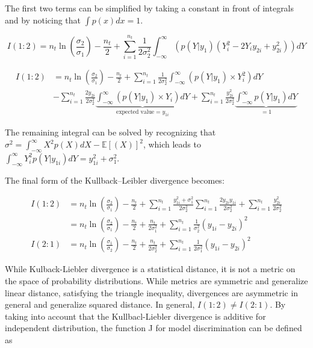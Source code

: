 \documentclass[../Article_Design_of_Experiment.tex]{subfiles}
\begin{document}
	The first two terms can be simplified by taking a constant in front of integrals and by noticing that $\int p(x) dx = 1$. 
	
	{\footnotesize
	\begin{equation}
		I(1:2) = n_t \ln \left(\frac{\sigma_2}{\sigma_1} \right) - \frac{n_t}{2} + \sum_{i=1}^{n_t} \frac{1}{2\sigma_2^2} \int_{-\infty}^{\infty} \left( p(Y|y_1) \left( Y_i^2 - 2Y_iy_{2i} + y_{2i}^2 \right)  \right) dY
	\end{equation}} 
	
	{\footnotesize
	\begin{align}
		I(1:2) &= n_t \ln \left(\frac{\sigma_2}{\sigma_1} \right) - \frac{n_t}{2} + \sum_{i=1}^{n_t} \frac{1}{2\sigma_2^2} \int_{-\infty}^{\infty} \left( p(Y|y_1) \times Y_i^2  \right) dY \nonumber \\ 
		&-\sum_{i=1}^{n_t} \frac{2y_{2i}}{2\sigma_2^2} \underbrace{\int_{-\infty}^{\infty} \left( p(Y|y_1) \times Y_i  \right) dY}_{\text{expected value} = y_{1i} } +\sum_{i=1}^{n_t} \frac{y_{2i}^2}{2\sigma_2^2} \underbrace{\int_{-\infty}^{\infty} p(Y|y_1) dY}_{=1}
	\end{align} }
	
	The remaining integral can be solved by recognizing that $\sigma^2 = \int_{-\infty}^{\infty} X^2 p(X) dX - \mathbb{E}[(X)]^2$, which leads to $\int_{-\infty}^{\infty} Y_i^2 p(Y|y_{1i}) dY = y_{1i}^2 + \sigma_1^2$. 
	
	The final form of the Kullback–Leibler divergence becomes:
	
	{\footnotesize
	\begin{align}
		I(1:2) &= n_t \ln \left(\frac{\sigma_2}{\sigma_1} \right) - \frac{n_t}{2} + \sum_{i=1}^{n_t} \frac{y_{1i}^2 + \sigma_1^2}{2\sigma_2^2} \sum_{i=1}^{n_t} \frac{2y_{2i}y_{1i}}{2\sigma_2^2} +\sum_{i=1}^{n_t}  \frac{y_{2i}^2}{2\sigma_2^2} \nonumber \\
		&= n_t \ln \left(\frac{\sigma_2}{\sigma_1} \right) - \frac{n_t}{2} + \frac{n_t}{2\sigma_1^2} + \sum_{i=1}^{n_t} \frac{1}{\sigma_2^2} \left( y_{1i} - y_{2i} \right)^2 \\
		I(2:1) &= n_t \ln \left(\frac{\sigma_1}{\sigma_2} \right) - \frac{n_t}{2} + \frac{n_t}{2\sigma_2^2} + \sum_{i=1}^{n_t} \frac{1}{2\sigma_1^2} \left( y_{1i} - y_{2i} \right)^2
	\end{align} }
	
	While Kulback-Liebler divergence is a statistical distance, it is not a metric on the space of probability distributions. While metrics are symmetric and generalize linear distance, satisfying the triangle inequality, divergences are asymmetric in general and generalize squared distance. In general, $I(1:2)\neq I(2:1)$. By taking into account that the Kullbacl-Liebler divergence is additive for independent distribution, the function J for model discrimination can be defined as 
	
\end{document}

